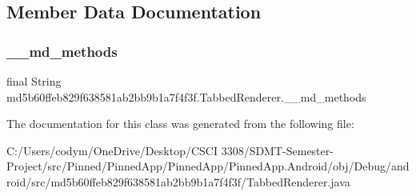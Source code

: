 \subsection{Member Data Documentation}
\mbox{\label{classmd5b60ffeb829f638581ab2bb9b1a7f4f3f_1_1_tabbed_renderer_a38151846bc49cd1f6a91896a729a40ec}} 
\subsubsection{\texorpdfstring{\+\_\+\+\_\+md\+\_\+methods}{\_\_md\_methods}}
{\footnotesize\ttfamily final String md5b60ffeb829f638581ab2bb9b1a7f4f3f.\+Tabbed\+Renderer.\+\_\+\+\_\+md\+\_\+methods\hspace{0.3cm}{\ttfamily [static]}}



The documentation for this class was generated from the following file\+:\begin{DoxyCompactItemize}
\item 
C\+:/\+Users/codym/\+One\+Drive/\+Desktop/\+C\+S\+C\+I 3308/\+S\+D\+M\+T-\/\+Semester-\/\+Project/src/\+Pinned/\+Pinned\+App/\+Pinned\+App/\+Pinned\+App.\+Android/obj/\+Debug/android/src/md5b60ffeb829f638581ab2bb9b1a7f4f3f/Tabbed\+Renderer.\+java\end{DoxyCompactItemize}
